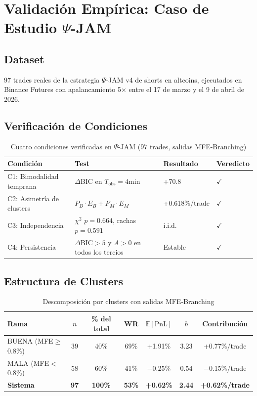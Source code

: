 \documentclass[11pt,a4paper]{article}
\begin{document}
\section{Validación Empírica: Caso de Estudio $\Psi$-JAM}

\subsection{Dataset}

97 trades reales de la estrategia $\Psi$-JAM v4 de shorts en altcoins, ejecutados en Binance Futures con apalancamiento 5$\times$ entre el 17 de marzo y el 9 de abril de 2026.

\subsection{Verificación de Condiciones}

\begin{table}[H]
\centering
\caption{Cuatro condiciones verificadas en $\Psi$-JAM (97 trades, salidas MFE-Branching)}
\begin{tabular}{llll}
\toprule
Condición & Test & Resultado & Veredicto \\
\midrule
C1: Bimodalidad temprana & $\Delta$BIC en $T_{\text{obs}}=4$min & +70.8 & $\checkmark$ \\
C2: Asimetría de clusters & $P_B \cdot E_B + P_M \cdot E_M$ & +0.618\%/trade & $\checkmark$ \\
C3: Independencia & $\chi^2$ $p=0.664$, rachas $p=0.591$ & i.i.d. & $\checkmark$ \\
C4: Persistencia & $\Delta$BIC$>5$ y $A>0$ en todos los tercios & Estable & $\checkmark$ \\
\bottomrule
\end{tabular}
\end{table}

\subsection{Estructura de Clusters}

\begin{table}[H]
\centering
\caption{Descomposición por clusters con salidas MFE-Branching}
\begin{tabular}{lcccccc}
\toprule
Rama & $n$ & \% del total & WR & $\mathbb{E}[\text{PnL}]$ & $b$ & Contribución \\
\midrule
BUENA (MFE$\geq$0.8\%) & 39 & 40\% & 69\% & +1.91\% & 3.23 & +0.77\%/trade \\
MALA (MFE$<$0.8\%) & 58 & 60\% & 41\% & $-$0.25\% & 0.54 & $-$0.15\%/trade \\
\midrule
\textbf{Sistema} & \textbf{97} & \textbf{100\%} & \textbf{53\%} & \textbf{+0.62\%} & \textbf{2.44} & \textbf{+0.62\%/trade} \\
\bottomrule
\end{tabular}
\end{table}
\end{document}
